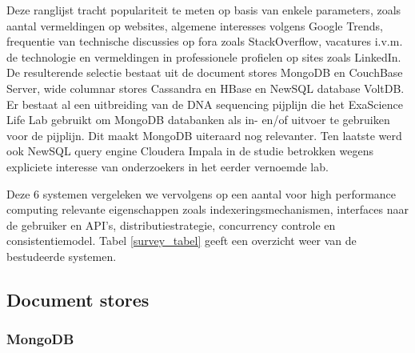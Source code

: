 \begin{landscape}

\label{survey_tabel}
\end{landscape}

Deze ranglijst tracht populariteit te meten op basis van enkele parameters, zoals aantal vermeldingen op websites, algemene interesses volgens Google Trends, frequentie van technische discussies op fora zoals StackOverflow, vacatures i.v.m. de technologie en vermeldingen in professionele profielen op sites zoals LinkedIn. De resulterende selectie bestaat uit de document stores MongoDB en CouchBase Server, wide columnar stores Cassandra en HBase en NewSQL database VoltDB. Er bestaat al een uitbreiding van de DNA sequencing pijplijn die het ExaScience Life Lab gebruikt om MongoDB  databanken als in- en/of uitvoer te gebruiken voor de pijplijn. Dit maakt MongoDB uiteraard nog relevanter. Ten laatste werd ook NewSQL query engine Cloudera Impala in de studie betrokken wegens expliciete interesse van onderzoekers in het eerder vernoemde lab.

\noindent Deze 6 systemen vergeleken we vervolgens op een aantal voor high performance computing relevante eigenschappen zoals indexeringsmechanismen, interfaces naar de gebruiker en API's, distributiestrategie, concurrency controle en consistentiemodel. Tabel \ref{survey_tabel} geeft een overzicht weer van de bestudeerde systemen.

\subsection{Document stores}

\subsubsection{MongoDB}

